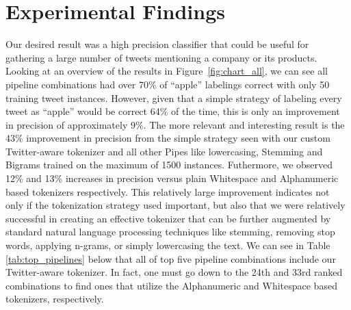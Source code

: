 \documentclass[letterpaper]{article}
\begin{document}
\section{Experimental Findings}

Our desired result was a high precision classifier that could be useful for gathering a large number of tweets mentioning a company or its products. Looking at an overview of the results in Figure~\ref{fig:chart_all}, we can see all pipeline combinations had over 70\% of ``apple'' labelings correct with only 50 training tweet instances. However, given that a simple strategy of labeling every tweet as ``apple'' would be correct 64\% of the time, this is only an improvement in precision of approximately 9\%. The more relevant and interesting result is the 43\% improvement in precision from the simple strategy seen with our custom Twitter-aware tokenizer and all other Pipes like lowercasing, Stemming and Bigrams trained on the maximum of 1500 instances. Futhermore, we observed 12\% and 13\% increases in precision versus plain Whitespace and Alphanumeric based tokenizers respectively. This relatively large improvement indicates not only if the tokenization strategy used important, but also that we were relatively successful in creating an effective tokenizer that can be further augmented by standard natural language processing techniques like stemming, removing stop words, applying n-grams, or simply lowercasing the text. We can see in Table \ref{tab:top_pipelines} below that all of top five pipeline combinations include our Twitter-aware tokenizer. In fact, one must go down to the 24th and 33rd ranked combinations to find ones that utilize the Alphanumeric and Whitespace based tokenizers, respectively.
\end{document}
